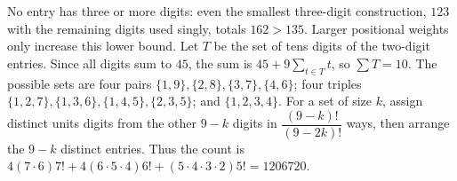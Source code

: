 No entry has three or more digits: even the smallest three-digit construction, $ 123 $ with the remaining digits used singly, totals $ 162>135 $. Larger positional weights only increase this lower bound. Let $ T $ be the set of tens digits of the two-digit entries. Since all digits sum to $ 45 $, the sum is $ 45+9\sum_{t\in T}t $, so $\sum T=10 $. The possible sets are four pairs $\{1,9\},\{2,8\},\{3,7\},\{4,6\}$; four triples $\{1,2,7\},\{1,3,6\},\{1,4,5\},\{2,3,5\}$; and $\{1,2,3,4\}$. For a set of size $ k $, assign distinct units digits from the other $ 9-k $ digits in $\dfrac{(9-k)!}{(9-2k)!}$ ways, then arrange the $ 9-k $ distinct entries. Thus the count is $ 4(7\cdot6)7!+4(6\cdot5\cdot4)6!+(5\cdot4\cdot3\cdot2)5!=\boxed{1206720}$.
